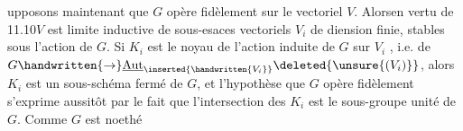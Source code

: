 upposons maintenant  que $G$ opère fidèlement sur le vectoriel $V$. Alors\handwritten{,}en vertu de 11.10\handwritten{,}$V$ est limite inductive de sous-esaces vectoriels $V_i$ de diension finie, stables sous l'action de $G$. Si $K_i$ est le noyau de l'action induite de $G$ sur $V_i$ , i.e. de $G\handwritten{\to}\underline{\operatorname{Aut}}_{\inserted{\handwritten{V_i}}}\deleted{\unsure{(V_i)}}$, alors $K_i$ est un sous-schéma fermé de $G$, et l'hypothèse que $G$ opère fidèlement s'exprime aussitôt par le fait que  l'intersection des $K_i$ est le sous-groupe unité de $G$. Comme $G$ est noethé%
